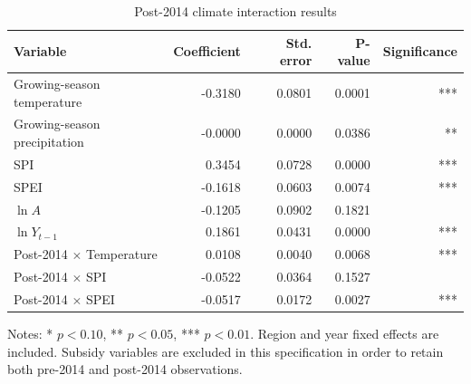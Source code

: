 \begin{table}[H]
\centering
\caption{Post-2014 climate interaction results}
\label{tab:post2014_interactions}
\begin{tabular}{lrrrr}
\toprule
Variable & Coefficient & Std. error & P-value & Significance \\
\midrule
Growing-season temperature & -0.3180 & 0.0801 & 0.0001 & *** \\
Growing-season precipitation & -0.0000 & 0.0000 & 0.0386 & ** \\
SPI & 0.3454 & 0.0728 & 0.0000 & *** \\
SPEI & -0.1618 & 0.0603 & 0.0074 & *** \\
$\ln A$ & -0.1205 & 0.0902 & 0.1821 &  \\
$\ln Y_{t-1}$ & 0.1861 & 0.0431 & 0.0000 & *** \\
Post-2014 $\times$ Temperature & 0.0108 & 0.0040 & 0.0068 & *** \\
Post-2014 $\times$ SPI & -0.0522 & 0.0364 & 0.1527 &  \\
Post-2014 $\times$ SPEI & -0.0517 & 0.0172 & 0.0027 & *** \\
\bottomrule
\end{tabular}
\begin{flushleft}
\footnotesize Notes: * $p<0.10$, ** $p<0.05$, *** $p<0.01$. Region and year fixed effects are included. Subsidy variables are excluded in this specification in order to retain both pre-2014 and post-2014 observations.
\end{flushleft}
\end{table}
